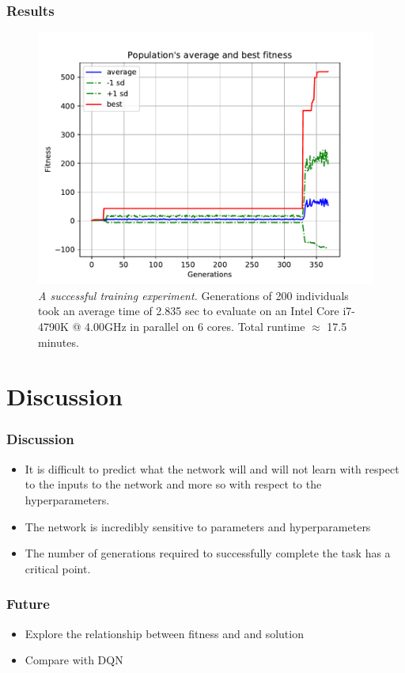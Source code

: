 \documentclass[t,pdflatex]{beamer}
\begin{document}
    \begin{frame}

        \frametitle{Results}
         \begin{figure}[h!]
            \centering
            \includegraphics[width=.7 \textwidth]{avg_fitness.pdf}
            \caption{\textit{A successful training experiment.} 
                Generations of 200 individuals took an average time of 2.835 sec to evaluate on an
                Intel Core i7-4790K @ 4.00GHz in parallel on 6 cores. Total runtime $\approx$ 17.5 minutes.}
        \end{figure}

    \end{frame}

\section{Discussion}

        \begin{frame}

        \frametitle{Discussion}
         \begin{itemize}
             \item It is difficult to predict what the network will and will not learn with respect to the inputs to the network and more so with respect to the hyperparameters.
             \item The network is incredibly sensitive to parameters and hyperparameters
             \item The number of generations required to successfully complete the task has a critical point.
         \end{itemize}

    \end{frame}

        \begin{frame}

        \frametitle{Future}
        \begin{itemize}
            \item Explore the relationship between fitness and and solution
            \item Compare with DQN
        \end{itemize}


    \end{frame}
\end{document}
